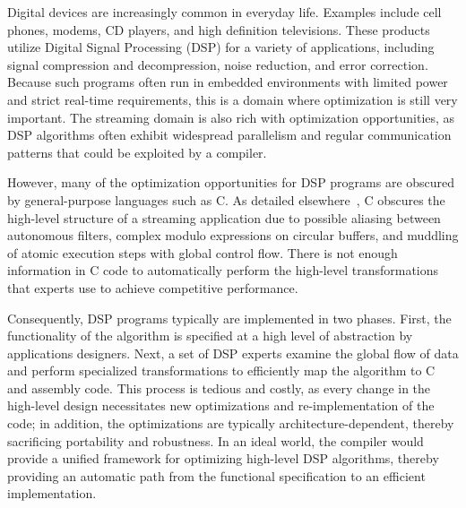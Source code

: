 

Digital devices are increasingly common in everyday life. Examples
include cell phones, modems, CD players, and high definition
televisions. These products utilize Digital Signal Processing (DSP)
for a variety of applications, including signal compression and
decompression, noise reduction, and error correction.  Because such
programs often run in embedded environments with limited power and
strict real-time requirements, this is a domain where optimization is
still very important.  The streaming domain is also rich with
optimization opportunities, as DSP algorithms often exhibit widespread
parallelism and regular communication patterns that could be exploited
by a compiler.

However, many of the optimization opportunities for DSP programs are
obscured by general-purpose languages such as C.  As detailed
elsewhere~\cite{streamitcc}, C obscures the high-level structure of a
streaming application due to possible aliasing between autonomous
filters, complex modulo expressions on circular buffers, and muddling
of atomic execution steps with global control flow.  There is not
enough information in C code to automatically perform the high-level
transformations that experts use to achieve competitive performance.

Consequently, DSP programs typically are implemented in two phases.
First, the functionality of the algorithm is specified at a high level
of abstraction by applications designers.  Next, a set of DSP experts
examine the global flow of data and perform specialized
transformations to efficiently map the algorithm to C and assembly
code.  This process is tedious and costly, as every change in the
high-level design necessitates new optimizations and re-implementation
of the code; in addition, the optimizations are typically
architecture-dependent, thereby sacrificing portability and
robustness.  In an ideal world, the compiler would provide a unified
framework for optimizing high-level DSP algorithms, thereby providing
an automatic path from the functional specification to an efficient
implementation.

